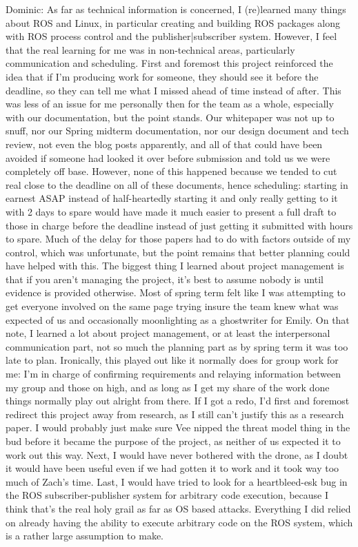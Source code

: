 \documentclass[IEEEtran,letterpaper,10pt,notitlepage,draftclsnofoot,onecolumn]{article}
\begin{document}
Dominic:
As far as technical information is concerned, I (re)learned many
things about ROS and Linux, in particular creating and building 
ROS packages along with ROS process control and the publisher|subscriber 
system. However, I feel that the real learning for me was in 
non-technical areas, particularly communication and scheduling. First 
and foremost this project reinforced the idea that if I’m producing 
work for someone, they should see it before the deadline, so they 
can tell me what I missed ahead of time instead of after. This was less 
of an issue for me personally then for the team as a whole, especially 
with our documentation, but the point stands. Our whitepaper was not 
up to snuff, nor our Spring midterm documentation, nor our design document 
and tech review, not even the blog posts apparently, and all of that could 
have been avoided if someone had looked it over before submission and told 
us we were completely off base. However, none of this happened because we 
tended to cut real close to the deadline on all of these documents, hence 
scheduling: starting in earnest ASAP instead of half-heartedly starting it 
and only really getting to it with 2 days to spare would have made it much 
easier to present a full draft to those in charge before the deadline instead 
of just getting it submitted with hours to spare. Much of the delay for those 
papers had to do with factors outside of my control, which was unfortunate, but 
the point remains that better planning could have helped with this. The biggest 
thing I learned about project management is that if you aren’t managing the 
project, it’s best to assume nobody is until evidence is provided otherwise. 
Most of spring term felt like I was attempting to get everyone involved on the 
same page trying insure the team knew what was expected of us and occasionally 
moonlighting as a ghostwriter for Emily. On that note, I learned a lot about 
project management, or at least the interpersonal communication part, not so 
much the planning part as by spring term it was too late to plan. Ironically, 
this played out like it normally does for group work for me: I’m in charge of 
confirming requirements and relaying information between my group and those on 
high, and as long as I get my share of the work done things normally play out 
alright from there. If I got a redo, I’d first and foremost redirect this
project away from research, as I still can’t justify this as a research paper.
I would probably just make sure Vee nipped the threat model thing in the bud 
before it became the purpose of the project, as neither of us expected it to 
work out this way. Next, I would have never bothered with the drone, as I doubt 
it would have been useful even if we had gotten it to work and it took way too 
much of Zach’s time. Last, I would have tried to look for a heartbleed-esk bug 
in the ROS subscriber-publisher system for arbitrary code execution, because I 
think that’s the real holy grail as far as OS based attacks. Everything I did 
relied on already having the ability to execute arbitrary code on the ROS 
system, which is a rather large assumption to make.
\end{document}
